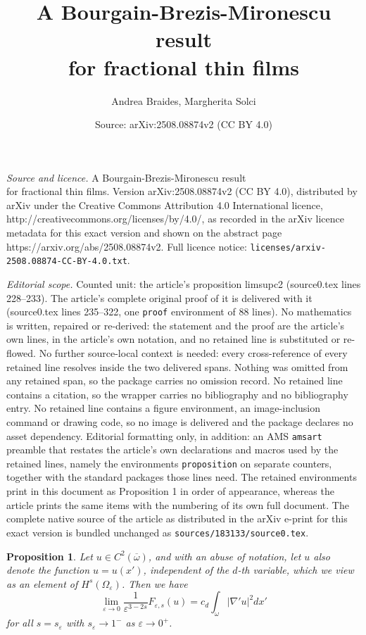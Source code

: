 \documentclass[10pt,a4paper]{amsart}
\title{A Bourgain-Brezis-Mironescu result\\ for fractional thin films}
\author{Andrea Braides, Margherita Solci}
\date{Source: arXiv:2508.08874v2 (CC BY 4.0)}
\newtheorem{proposition}{Proposition}
\newcommand{\e}{\varepsilon}
\begin{document}
\maketitle

\noindent\emph{Source and licence.} A Bourgain-Brezis-Mironescu result\\ for fractional thin films. Version arXiv:2508.08874v2 (CC BY 4.0), distributed by arXiv under the Creative Commons Attribution 4.0 International licence, http://creativecommons.org/licenses/by/4.0/, as recorded in the arXiv licence metadata for this exact version and shown on the abstract page https://arxiv.org/abs/2508.08874v2. Full licence notice: \texttt{licenses/arxiv-2508.08874-CC-BY-4.0.txt}.\par\smallskip

\noindent\textit{Editorial scope.} Counted unit: the article's proposition limsupc2 (source0.tex lines 228--233). The article's complete original proof of it is delivered with it (source0.tex lines 235--322, one \texttt{proof} environment of 88 lines). No mathematics is written, repaired or re-derived: the statement and the proof are the article's own lines, in the article's own notation, and no retained line is substituted or re-flowed.  No further source-local context is needed: every cross-reference of every retained line resolves inside the two delivered spans.  Nothing was omitted from any retained span, so the package carries no omission record.  No retained line contains a citation, so the wrapper carries no bibliography and no bibliography entry.  No retained line contains a figure environment, an image-inclusion command or drawing code, so no image is delivered and the package declares no asset dependency.  Editorial formatting only, in addition: an AMS \texttt{amsart} preamble that restates the article's own declarations and macros used by the retained lines, namely the environments \texttt{proposition} on separate counters, together with the standard packages those lines need.  The retained environments print in this document as Proposition 1 in order of appearance, whereas the article prints the same items with the numbering of its own full document.  The complete native source of the article as distributed in the arXiv e-print for this exact version is bundled unchanged as \texttt{sources/183133/source0.tex}.
\begin{proposition}\label{limsupc2} Let $u\in C^2(\overline\omega)$, and with an abuse of notation, let $u$ also denote the function $u=u(x')$, independent of the $d$-th variable, which we view as an element of  $H^s(\Omega_\e)$. Then we have
\begin{equation}
\lim_{\e\to 0} \frac{1}{\e^{3-2s}}F_{\e,s}(u)= c_d\int_\omega |\nabla'u|^2dx'
\end{equation}
for all $s=s_\e$ with $s_\e\to 1^-$ as $\e\to 0^+$.
\end{proposition}
\end{document}
